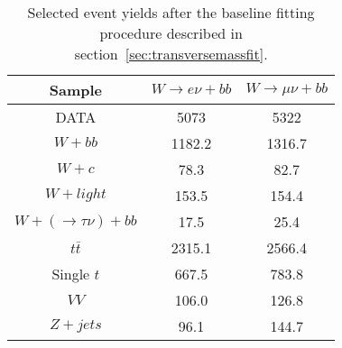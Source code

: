 \begin{table}[htb]
\begin{center}
\begin{tabular}{|c|c|c|}
\hline
\textbf{Sample} & $W \rightarrow e \nu + bb$ & $W \rightarrow \mu \nu + bb$ \\
\hline
DATA        & 5073   & 5322 \\
\hline
$W + bb$    & 1182.2 & 1316.7 \\
$W + c$     & 78.3   & 82.7 \\
$W + light$ & 153.5  & 154.4 \\
$W + (\rightarrow \tau \nu) + bb$  & 17.5 & 25.4 \\
$t\bar{t}$  & 2315.1 & 2566.4 \\
Single $t$  & 667.5  & 783.8 \\
$VV$        & 106.0  & 126.8 \\
$Z + jets$  & 96.1   & 144.7 \\
\hline
\end{tabular}
\end{center}
\caption{Selected event yields after the baseline fitting procedure described in
  section~\ref{sec:transversemassfit}.}
\label{tab:yieldsPostfit}
\end{table}


